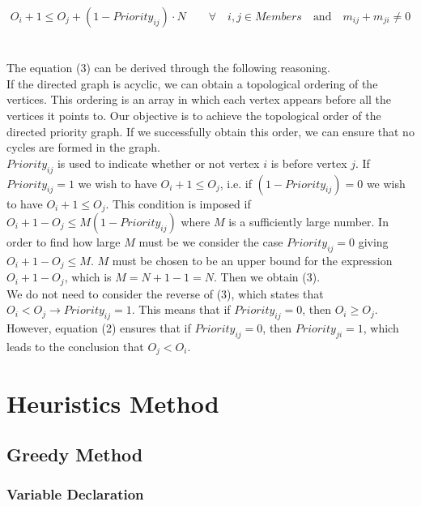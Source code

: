 \documentclass{article}
\begin{document}
\begin{equation}
    O_{i} + 1 \leq O_{j} + (1 - Priority_{ij}) \cdot N \qquad \forall \quad i,j \in Members \quad \textrm{and} \quad m_{ij} + m_{ji} \neq 0
\end{equation}
\\
\\
The equation (3) can be derived through the following reasoning.\\
If the directed graph is acyclic, we can obtain a topological ordering of the vertices. This ordering is an array in which each vertex appears before all the vertices it points to. Our objective is to achieve the topological order of the directed priority graph. If we successfully obtain this order, we can ensure that no cycles are formed in the graph.\\
$Priority_{ij}$ is used to indicate whether or not vertex $i$ is before vertex $j$.
If $Priority_{ij} = 1$ we wish to have $O_{i} + 1 \leq O_{j}$, i.e. if $(1 - Priority_{ij}) = 0$ we wish to have $O_{i} + 1 \leq O_{j}$. This condition is imposed if $O_{i} + 1 - O_{j} \leq M(1-Priority_{ij})$ where $M$ is a sufficiently large number. In order to find how large $M$ must be we consider the case $Priority_{ij} = 0$ giving $O_{i} + 1 - O_{j} \leq M$. $M$ must be chosen to be an upper bound for the expression $O_{i} + 1 - O_{j}$, which is $M = N + 1 - 1 = N$. Then we obtain (3).\\
We do not need to consider the reverse of (3), which states that $ O_{i} < O_{j}
 \rightarrow Priority_{ij} = 1$. This means that if $Priority_{ij} = 0$, then $O_{i} \geq O_{j}$. However, equation (2) ensures that if $Priority_{ij} = 0$, then $Priority_{ji} = 1$, which leads to the conclusion that $O_{j} < O_{i}$.


\section{Heuristics Method}




\subsection{Greedy Method}

\subsubsection{Variable Declaration} \label{declaration}
\end{document}
